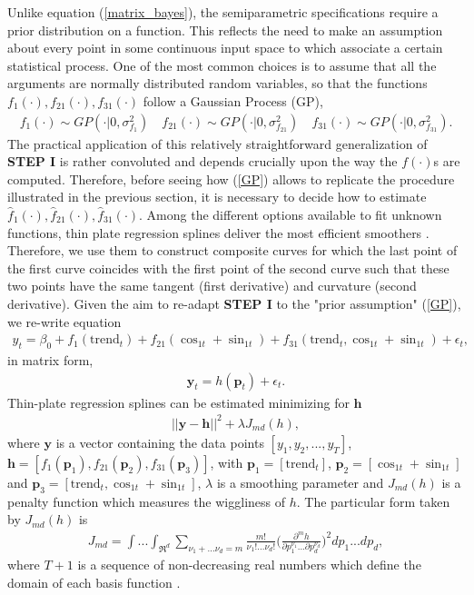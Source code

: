 \documentclass{article}\usepackage[]{graphicx}\usepackage[]{color}
\begin{document}
Unlike equation (\ref{matrix_bayes}), the semiparametric specifications require a prior distribution on a function. This reflects the need to make an assumption about every point in some continuous input space to which associate a certain statistical process. One of the most common choices is to assume that all the arguments are normally distributed random variables, so that the functions $ f_1(\cdot), f_{21} (\cdot), f_{31}(\cdot)$ follow a Gaussian Process (GP),
\begin{align}\label{GP}
f_1(\cdot) \sim GP(\cdot | 0, \sigma_{f_1}^2) \quad f_{21}(\cdot) \sim GP(\cdot | 0, \sigma_{f_{21}}^2) \quad f_{31}(\cdot) \sim GP(\cdot | 0, \sigma_{f_{31}}^2).
\end{align}
The practical application of this relatively straightforward generalization of \textbf{STEP I} is rather convoluted and depends crucially upon the way the $ f(\cdot) $s are computed. Therefore, before seeing how (\ref{GP}) allows to replicate the procedure illustrated in the previous section, it is necessary to decide how to estimate $ \hat{f}_1(\cdot), \hat{f}_{21}(\cdot),  \hat{f}_{31}(\cdot)$. Among the different options available to fit unknown functions, thin plate regression splines deliver the most efficient smoothers \cite{wood2003thin}. Therefore, we use them to construct composite curves for which the last point of the first curve coincides with the first point of the second curve such that these two points have the same tangent (first derivative) and curvature (second derivative). Given the aim to re-adapt \textbf{STEP I} to the "prior assumption" (\ref{GP}), we re-write equation 
\begin{align}\label{fourier_gam_int_1st}
y_{t}=\beta_{0}+f_{1}(\text{trend}_{t})+f_{21}(\cos_{1t}+\sin_{1t})+f_{31}(\text{trend}_{t}, \cos_{1t}+\sin_{1t})+\epsilon_{t},
\end{align}
in matrix form,
\begin{align}\label{GAM}
\mathbf{y}_t= h(\mathbf{p}_t) + \epsilon_t. 
\end{align}
Thin-plate regression splines can be estimated minimizing for $\mathbf{h}$
\begin{align}\label{euclidian}
|| \mathbf{y} - \mathbf{h} ||^{2} + \lambda J_{md}(h),
\end{align}
where $ \mathbf{y} $ is a vector containing the data points $ [y_{1}, y_{2}, ..., y_{T}] $, $ \mathbf{h} = [f_{1}(\mathbf{p}_1), f_{21}(\mathbf{p}_2), f_{31}(\mathbf{p}_3)]$, with $ \mathbf{p}_1 = [\text{trend}_{t}] $, $ \mathbf{p}_2 = [\cos_{1t}+\sin_{1t}] $ and $ \mathbf{p}_3 = [\text{trend}_{t}, \cos_{1t}+\sin_{1t}] $, $ \lambda $ is a smoothing parameter and $ J_{md}(h) $ is a penalty function which measures the wiggliness of $h$. The particular form taken by $ J_{md}(h) $ is   
\begin{align} \label{penalty}
J_{md} = \int ... \int_{\Re^d} \sum_{\nu_1+...\nu_d = m} \frac{m!}{\nu_1!...\nu_d!} \Big( \frac{\partial^m h}{\partial p_1^{\nu_1}...\partial p_d^{\nu_d}} \Big)^2 d p_1...d p_d ,
\end{align}
where $T+1$ is a sequence of non-decreasing real numbers which define the domain of each basis function \cite{duchon1977splines}. 
\end{document}
